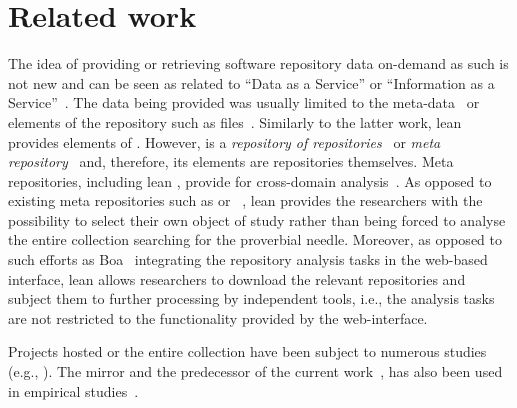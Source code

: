 
\section{Related work}
\label{sec:relwork}

The idea of providing or retrieving software repository data on-demand as such is not new
and can be seen as related to ``Data as a Service'' or ``Information as a Service''~\cite{Dan2007IaaS}.
The data being provided was usually limited to the meta-data~\cite{Codebook} or elements of the
repository such as files~\cite{Voinea2006Mining}.
Similarly to the latter work, lean \ght provides elements of \gh.
However, \gh is a \emph{repository of repositories}~\cite{Sowe2007Using} or
\emph{meta repository}~\cite{Gruhn2013Security} and, therefore, its elements are repositories themselves.
Meta repositories, including lean \ght, provide for cross-domain analysis~\cite{Sowe2007Using}.
As opposed to existing meta repositories such as \ohloh or \flossmole~\cite{Howisom2006FLOSSmole}, %
lean \ght provides the researchers with the possibility to select their own object of study rather than
being forced to analyse the entire collection searching for the proverbial needle.%
Moreover, as opposed to such efforts as Boa~\cite{Dyer-Nguyen-Rajan-Nguyen-13} integrating the repository analysis 
tasks in the web-based interface, lean \ght allows researchers to download the relevant repositories
and subject them to further processing by independent tools, i.e., the analysis tasks are not restricted to
the functionality provided by the web-interface.

Projects hosted \gh or the entire \gh collection have been subject to numerous studies (e.g., \cite{allamanis2013mining,dabbish2012social,heller2011visualizing,%
gousios2014exploratory,jiang2013understanding,
lee2013git,marlow2013impression,pham2013creating,
pham2013building,%
schall2013follow,
thung2013network}).
The \gh mirror and the predecessor of the current work~\cite{gousios2012ghtorent},
has also been used in empirical studies~\cite{squire2014forge,vasilescu2013stackoverflow}.


